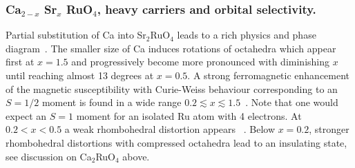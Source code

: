 \documentclass[]{ar2e-changed}%
\begin{document}

\subsubsection{Ca${_{2-x}}$ Sr$_{x}$ RuO$_4$, heavy carriers and orbital selectivity.}
\label{sec:ruthenates_OSMT}

Partial substitution of Ca into Sr$_2$RuO$_4$ leads to a rich physics and phase diagram~\cite{nakatsuji_prl_2003}. 
%
The smaller size of Ca induces rotations of octahedra which
appear first at $x=1.5$ and progressively become more pronounced with
diminishing $x$ until reaching almost 13 degrees at $x=0.5$. 
%
A strong ferromagnetic enhancement of the magnetic susceptibility with Curie-Weiss
behaviour corresponding to an $S=1/2$ moment is found in a wide range $0.2\lesssim x \lesssim 1.5$~\cite{nakatsuji_prb_2000}. 
Note that one would expect an $S=1$ moment for an isolated Ru atom with 4 electrons. 
%
At $0.2<x<0.5$ a weak rhombohedral distortion appears ~\cite{steffens_prb_2011}.
%  
%
Below $x=0.2$, stronger rhombohedral distortions with compressed octahedra lead to 
an insulating state, see discussion on Ca$_2$RuO$_4$ above. %
\end{document}
